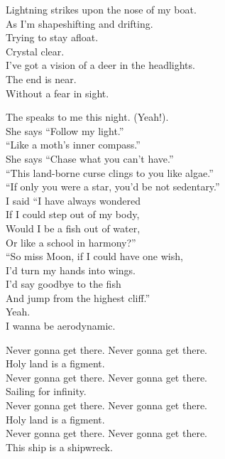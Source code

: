 Lightning strikes upon the nose of my boat. \\
As I'm shapeshifting and drifting. \\
Trying to stay afloat. \\
Crystal clear. \\
I've got a vision of a deer in the headlights. \\
The end is near. \\
Without a fear in sight. \\


The  speaks to me this night. (Yeah!). \\
She says ``Follow my light.'' \\
``Like a moth's inner compass.'' \\
She says ``Chase what you can't have.'' \\
``This land-borne curse clings to you like algae.'' \\
``If only you were a star, you'd be not sedentary.'' \\

I said ``I have always wondered \\
If I could step out of my body, \\
Would I be a fish out of water, \\
Or like a school in harmony?'' \\
``So miss Moon, if I could have one wish, \\
I'd turn my hands into wings. \\
I'd say goodbye to the fish \\
And jump from the highest cliff.'' \\
Yeah. \\

I wanna be aerodynamic. \\


Never gonna get there. Never gonna get there. \\
Holy land is a figment. \\
Never gonna get there. Never gonna get there. \\
Sailing for infinity. \\
Never gonna get there. Never gonna get there. \\
Holy land is a figment. \\
Never gonna get there. Never gonna get there. \\
This ship is a shipwreck. \\

